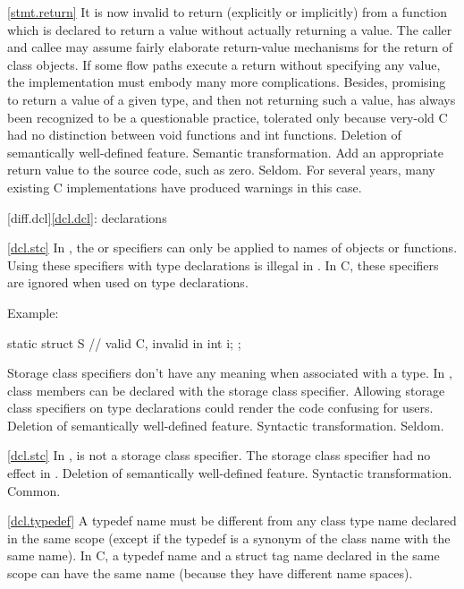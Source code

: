\ref{stmt.return}
\change It is now invalid to return (explicitly or implicitly) from a function which is
declared to return a value without actually returning a value.
\rationale
The caller and callee may assume fairly elaborate
return-value mechanisms for the return of class objects.
If
some flow paths execute a return without specifying any value,
the implementation must embody many more complications.
Besides,
promising to return a value of a given type, and then not returning
such a value, has always been recognized to be a questionable
practice, tolerated only because very-old C had no distinction between
void  functions and  int  functions.
\effect
Deletion of semantically well-defined feature.
\difficulty
Semantic transformation.
Add an appropriate return value to the source code, such as zero.
\howwide
Seldom.
For several years, many existing C implementations have produced warnings in
this case.

[diff.dcl]{\ref{dcl.dcl}: declarations}

\ref{dcl.stc}
\change In \Cpp, the  or  specifiers can only be applied to names of objects or functions.\\
Using these specifiers with type declarations is illegal in \Cpp.
In C, these specifiers are ignored when used on type declarations.

Example:

\begin{codeblock}
static struct S {               // valid C, invalid in \Cpp
  int i;
};
\end{codeblock}

\rationale
Storage class specifiers don't have any meaning when associated
with a type.
In \Cpp, class members can be declared with the  storage
class specifier.
Allowing storage class specifiers on type
declarations could render the code confusing for users.
\effect
Deletion of semantically well-defined feature.
\difficulty
Syntactic transformation.
\howwide
Seldom.

\ref{dcl.stc}
\change In \Cpp,  is not a storage class specifier.
\rationale
The storage class specifier had no effect in \Cpp.
\effect
Deletion of semantically well-defined feature.
\difficulty
Syntactic transformation.
\howwide
Common.

\ref{dcl.typedef}
\change A \Cpp typedef name must be different from any class type name declared
in the same scope (except if the typedef is a synonym of the class name with the
same name). In C, a typedef name and a struct tag name declared in the same scope
can have the same name (because they have different name spaces).


